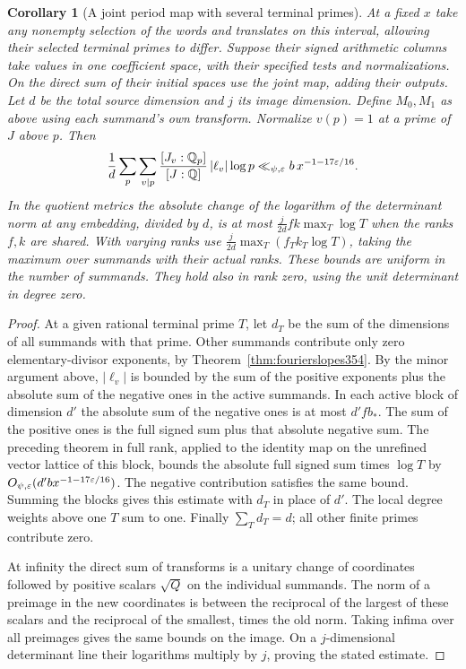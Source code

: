\documentclass[a4paper,11pt]{article}
\newtheorem{corollary}[proposition]{Corollary}
\theoremstyle{definition}
\theoremstyle{remark}
\numberwithin{equation}{section}
\begin{document}
\begin{corollary}[A joint period map with several terminal primes]\leavevmode
\label{cor:jointimage355}
At a fixed \(x\) take any nonempty selection of the words and
translates on this interval, allowing their selected terminal
primes to differ. Suppose their signed arithmetic columns take
values in one coefficient space, with their specified tests
and normalizations. On the direct sum of their initial spaces
use the joint map, adding their outputs. Let \(d\) be the
total source dimension and \(j\) its image dimension. Define
\(M_0,M_1\) as above using each summand's own transform.
Normalize \(v(p)=1\) at a prime of \(J\) above \(p\). Then
\[
  \frac1d\sum_{p}\sum_{v\mid p}
     \frac{[J_v:\mathbb Q_p]}{[J:\mathbb Q]}\,
               |\ell_v|\log p
          \ll_{\psi,\varepsilon} b\,x^{-1-17\varepsilon/16}.
\]
In the quotient metrics the absolute change of the logarithm
of the determinant norm at any embedding, divided by \(d\),
is at most \(\tfrac{j}{2d}fk\max_T\log T\) when the ranks
\(f,k\) are shared. With varying ranks use
\(\tfrac{j}{2d}\max_T (f_T k_T\log T)\), taking the maximum
over summands with their actual ranks. These bounds are uniform
in the number of summands. They hold also in rank zero, using
the unit determinant in degree zero.
\end{corollary}
\begin{proof}
At a given rational terminal prime \(T\), let \(d_T\) be the
sum of the dimensions of all summands with that prime. Other
summands contribute only zero elementary-divisor exponents,
by Theorem~\ref{thm:fourierslopes354}. By the minor argument
above, \(|\ell_v|\) is bounded by the sum of the positive
exponents plus the absolute sum of the negative ones in the
active summands. In each active block of dimension \(d'\) the
absolute sum of the negative ones is at most \(d' f b_*\).
The sum of the positive ones is the full signed sum plus that
absolute negative sum. The preceding theorem in full rank,
applied to the identity map on the unrefined vector lattice
of this block, bounds the absolute full signed sum times
\(\log T\) by \(O_{\psi,\varepsilon}(d'b x^{-1-17\varepsilon/16})\).
The negative contribution satisfies the same bound. Summing
the blocks gives this estimate with \(d_T\) in place of \(d'\).
The local degree weights above one \(T\) sum to one. Finally
\(\sum_T d_T=d\); all other finite primes contribute zero.

At infinity the direct sum of transforms is a unitary change
of coordinates followed by positive scalars \(\sqrt{Q}\) on
the individual summands. The norm of a preimage in the new
coordinates is between the reciprocal of the largest of these
scalars and the reciprocal of the smallest, times the old
norm. Taking infima over all preimages gives the same bounds
on the image. On a \(j\)-dimensional determinant line their
logarithms multiply by \(j\), proving the stated estimate.
\end{proof}
\end{document}
